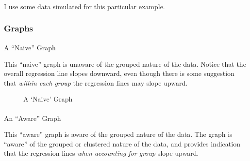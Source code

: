 \documentclass[
  letterpaper,
  DIV=11,
  numbers=noendperiod]{scrreprt}
\makeatletter
\let\oldparagraph\paragraph
\renewcommand{\paragraph}{
    \@ifstar
      \xxxParagraphStar
      \xxxParagraphNoStar
  }
\newcommand{\xxxParagraphStar}[1]{\oldparagraph*{#1}\mbox{}}
\newcommand{\xxxParagraphNoStar}[1]{\oldparagraph{#1}\mbox{}}
\makeatother
\begin{document}
I use some data simulated for this particular example.

\subsubsection{Graphs}\label{graphs}

\paragraph{A ``Naive'' Graph}\label{a-naive-graph}

This ``naive'' graph is unaware of the grouped nature of the data.
Notice that the overall regression line slopes downward, even though
there is some suggestion that \emph{within each group} the regression
lines may slope upward.

\begin{figure}


\caption{\label{fig-naive}A `Naive' Graph}

\end{figure}%

\paragraph{An ``Aware'' Graph}\label{an-aware-graph}

This ``aware'' graph is aware of the grouped nature of the data. The
graph is ``aware'' of the grouped or clustered nature of the data, and
provides indication that the regression lines \emph{when accounting for
group} slope upward.
\end{document}

